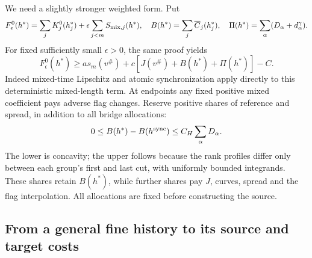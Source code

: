 We need a slightly stronger weighted form. Put
\[
 F_\epsilon^0(h^*)=\sum_jK_j^0(h_j^*)+
                   \epsilon\sum_{j<m}S_{{\rm mix},j}(h^*),
 \quad B(h^*)=\sum_j\overline C_j(h_j^*),
 \quad\Pi(h^*)=\sum_\alpha(D_\alpha+d_\alpha^\gamma).
\]
For fixed sufficiently small $\epsilon>0$, the same proof yields
\begin{equation}
 F_\epsilon^0(h^*)\ge as_m(v^\#)
           +c[J(v^\#)+B(h^*)+\Pi(h^*)]-C.
 \label{history:weighted-star-source}
\end{equation}
Indeed mixed-time Lipschitz and atomic synchronization apply directly
to this deterministic mixed-length term. At endpoints any fixed
positive mixed coefficient pays adverse flag changes. Reserve positive
shares of reference and spread, in addition to all bridge allocations:
\[
 0\le B(h^*)-B(h^{\rm sync})\le C_H\sum_\alpha D_\alpha.
\]
The lower is concavity; the upper follows because the rank profiles
differ only between each group's first and last cut, with uniformly
bounded integrands. These shares retain $B(h^*)$, while further shares
pay $J$, curves, spread and the flag interpolation. All allocations
are fixed before constructing the source.

\subsection{From a general fine history to its source and target costs}

